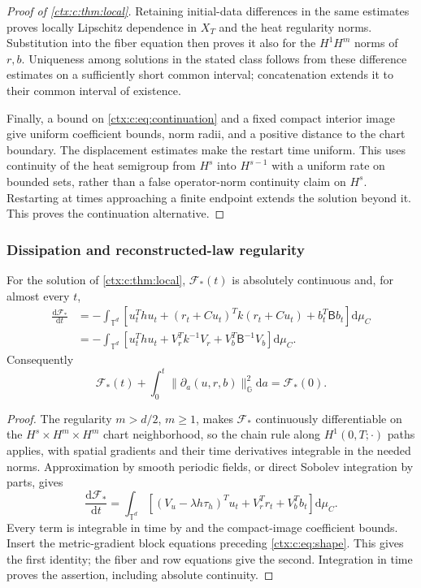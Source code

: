 \begin{proof}[Proof of \cref{ctx:c:thm:local}]
Retaining initial-data differences in the same estimates proves locally Lipschitz dependence in $X_T$ and the heat regularity norms. Substitution into the fiber equation then proves it also for the $H^1H^m$ norms of $r,b$. Uniqueness among solutions in the stated class follows from these difference estimates on a sufficiently short common interval; concatenation extends it to their common interval of existence.

Finally, a bound on \cref{ctx:c:eq:continuation} and a fixed compact interior image give uniform coefficient bounds, norm radii, and a positive distance to the chart boundary. The displacement estimates  make the restart time uniform. This uses continuity of the heat semigroup from $H^s$ into $H^{s-1}$ with a uniform rate on bounded sets, rather than a false operator-norm continuity claim on $H^s$. Restarting at times approaching a finite endpoint extends the solution beyond it. This proves the continuation alternative.
\end{proof}

\subsubsection{Dissipation and reconstructed-law regularity}

For the solution of \cref{ctx:c:thm:local}, $\mathcal F_*(t)$ is absolutely continuous and, for almost every $t$,
\begin{align}
 \frac{\mathrm d\mathcal F_*}{\mathrm d t}
 &=-\int_{\mathbb T^d}\left[u_t^Thu_t+(r_t+Cu_t)^Tk(r_t+Cu_t)+b_t^T\mathsf Bb_t\right]\mathrm d\mu_C\nonumber\\
 &=-\int_{\mathbb T^d}\left[u_t^Thu_t+V_r^Tk^{-1}V_r+V_b^T\mathsf B^{-1}V_b\right]\mathrm d\mu_C.
 \label{ctx:c:eq:dissipation}
\end{align}
Consequently
\begin{equation}
 \mathcal F_*(t)+\int_0^t\|\partial_a(u,r,b)\|_{\mathbb G}^2\mathrm d a
 =\mathcal F_*(0).
\end{equation}

\begin{proof}
The regularity $m>d/2$, $m\geq1$, makes $\mathcal F_*$ continuously differentiable on the $H^s\times H^m\times H^m$ chart neighborhood, so the chain rule along $H^1(0,T;\cdot)$ paths applies, with spatial gradients and their time derivatives integrable in the needed norms. Approximation by smooth periodic fields, or direct Sobolev integration by parts, gives
\begin{equation}
 \frac{\mathrm d\mathcal F_*}{\mathrm d t}
 =\int_{\mathbb T^d}[(V_u-\lambda h\tau_h)^Tu_t+V_r^Tr_t+V_b^Tb_t]\mathrm d\mu_C.
\end{equation}
Every term is integrable in time by  and the compact-image coefficient bounds. Insert the metric-gradient block equations preceding \cref{ctx:c:eq:shape}. This gives the first identity; the fiber and row equations give the second. Integration in time proves the assertion, including absolute continuity.
\end{proof}

